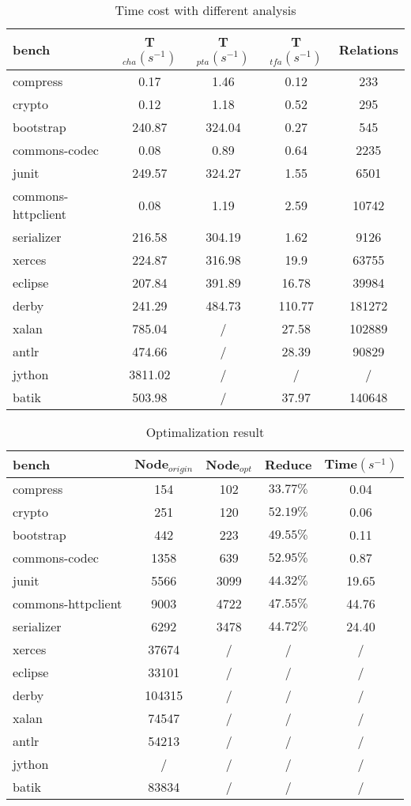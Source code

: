 \documentclass{llncs}
\begin{document}
\begin{table}[!htbp]\centering
\caption{Time cost with different analysis}
\begin{tabular}{lcccc}
	\hline
	\textbf{bench} & \textbf{T$_{cha}(s^{-1})$} & \textbf{T$_{pta}(s^{-1})$} & \textbf{T$_{tfa}(s^{-1})$} & \textbf{Relations} \\
	\hline
	compress & 0.17 & 1.46 & 0.12 & 233\\
	crypto & 0.12 & 1.18 & 0.52 & 295\\
	bootstrap & 240.87 & 324.04 & 0.27 & 545\\
	commons-codec & 0.08 & 0.89 & 0.64 & 2235\\
	junit & 249.57 & 324.27 & 1.55 & 6501\\
	commons-httpclient & 0.08 & 1.19 & 2.59 & 10742 \\
	serializer & 216.58 & 304.19 & 1.62 & 9126\\
	xerces & 224.87 & 316.98 & 19.9 & 63755\\
	eclipse & 207.84 & 391.89 & 16.78 & 39984\\
	derby & 241.29 & 484.73 & 110.77 & 181272\\
	xalan & 785.04 & / & 27.58 & 102889\\
	antlr & 474.66 & / & 28.39 & 90829\\
	jython & 3811.02 & / & /  & / \\
	batik & 503.98 & / & 37.97 & 140648 \\
	\hline
\end{tabular}
\label{experiment:Time Cost}
\end{table}

\begin{table}[!htbp]\centering
\caption{Optimalization result}
\begin{tabular}{lcccc}
	\hline
	\textbf{bench} & \textbf{Node$_{origin}$} & \textbf{Node$_{opt}$} & \textbf{Reduce} & \textbf{Time$(s^{-1})$} \\
	\hline
	compress & 154 & 102 & $33.77\%$ & 0.04 \\
	crypto & 251 & 120 & $52.19\%$ & 0.06 \\
	bootstrap & 442 & 223 & $49.55\%$ & 0.11 \\
	commons-codec & 1358 & 639 & $52.95\%$ & 0.87 \\
	junit & 5566 & 3099 & $44.32\%$ & 19.65 \\
	commons-httpclient & 9003 & 4722 & $47.55\%$ & 44.76 \\
	serializer & 6292 & 3478 & $44.72\%$ & 24.40 \\
	xerces & 37674 & / & / & /\\
	eclipse & 33101 & / & / & /\\
	derby & 104315 & / & / & /\\
	xalan & 74547 & /  & / & /\\
	antlr & 54213 & / & / & /\\
	jython & / & / & / & /\\
	batik & 83834 & / & / & /\\
	\hline
\end{tabular}
\label{experiment:Optimalization}
\end{table}




\end{document}

